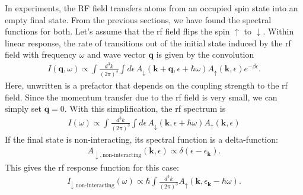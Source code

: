 \documentclass{article}
\theoremstyle{definition}
\newcommand{\be}{\beta}
\newcommand{\f}[2]{\frac{#1}{#2}}
\begin{document}
In experiments, the RF field transfers atoms from an occupied spin state into an empty final state. From the previous sections, we have found the spectral functions for both. Let's assume that the rf field flips the spin $\uparrow$ to $\downarrow$. Within linear response, the rate of transitions out of the initial state induced by the rf field with frequency $\omega$ and wave vector $\mathbf{q}$ is given by the convolution 
\begin{align}
I(\mathbf{q}, \omega)
\propto 
\int \f{d^3 k}{(2\pi)^3} \int d\epsilon \, A_\downarrow(\mathbf{k} + \mathbf{q}, \epsilon + \hbar \omega) A_\uparrow(\mathbf{k}, \epsilon) e^{-\be \epsilon}.
\end{align}
Here, unwritten is a prefactor that depends on the coupling strength to the rf field. Since the momentum transfer due to the rf field is very small, we can simply set $\mathbf{q} = 0$. With this simplification, the rf spectrum is 
\begin{align}
I(\omega) 
\propto
\int \f{d^3k}{(2\pi)^3} 
\int d\epsilon \, A_\downarrow(\mathbf{k}, \epsilon + \hbar \omega) A_\uparrow(\mathbf{k}, \epsilon)
\end{align}
If the final state is non-interacting, its spectral function is a delta-function:
\begin{align}
A_{\downarrow, \text{non-interacting}} (\mathbf{k},\epsilon) 
\propto
\delta(\epsilon - \epsilon_\mathbf{k}).
\end{align}
This gives the rf response function for this case:
\begin{align}
I_{\downarrow \text{ non-interacting}}(\omega) \propto 
\hbar \int \f{d^3k}{(2\pi)^3}  A_\uparrow(\mathbf{k}, \epsilon_\mathbf{k} - \hbar \omega).
\end{align}


 
	
\end{document}
